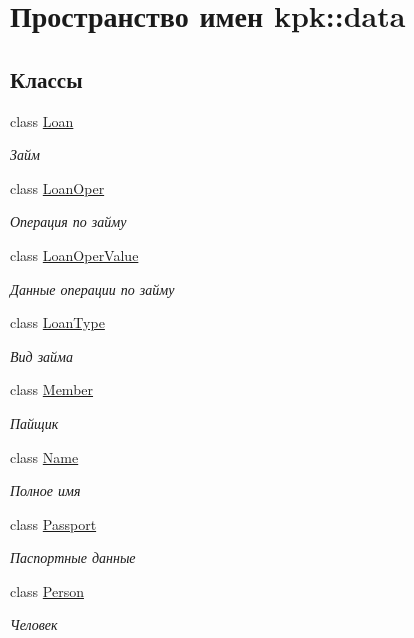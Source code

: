 \hypertarget{namespacekpk_1_1data}{}\section{Пространство имен kpk\+:\+:data}
\label{namespacekpk_1_1data}
\subsection*{Классы}
\begin{DoxyCompactItemize}
\item 
class \hyperlink{classkpk_1_1data_1_1_loan}{Loan}
\begin{DoxyCompactList}\small\item\em Займ \end{DoxyCompactList}\item 
class \hyperlink{classkpk_1_1data_1_1_loan_oper}{Loan\+Oper}
\begin{DoxyCompactList}\small\item\em Операция по займу \end{DoxyCompactList}\item 
class \hyperlink{classkpk_1_1data_1_1_loan_oper_value}{Loan\+Oper\+Value}
\begin{DoxyCompactList}\small\item\em Данные операции по займу \end{DoxyCompactList}\item 
class \hyperlink{classkpk_1_1data_1_1_loan_type}{Loan\+Type}
\begin{DoxyCompactList}\small\item\em Вид займа \end{DoxyCompactList}\item 
class \hyperlink{classkpk_1_1data_1_1_member}{Member}
\begin{DoxyCompactList}\small\item\em Пайщик \end{DoxyCompactList}\item 
class \hyperlink{classkpk_1_1data_1_1_name}{Name}
\begin{DoxyCompactList}\small\item\em Полное имя \end{DoxyCompactList}\item 
class \hyperlink{classkpk_1_1data_1_1_passport}{Passport}
\begin{DoxyCompactList}\small\item\em Паспортные данные \end{DoxyCompactList}\item 
class \hyperlink{classkpk_1_1data_1_1_person}{Person}
\begin{DoxyCompactList}\small\item\em Человек \end{DoxyCompactList}\end{DoxyCompactItemize}
